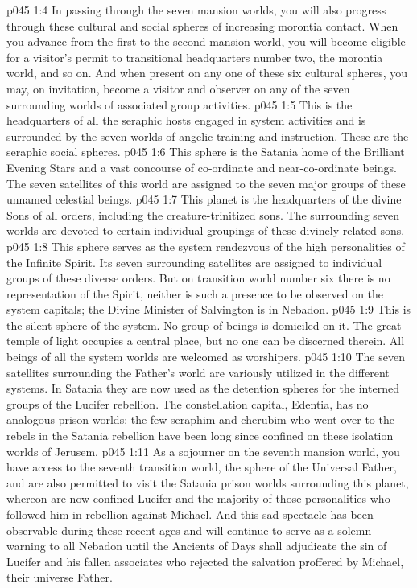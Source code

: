 \vs p045 1:4 In passing through the seven mansion worlds, you will also progress through these cultural and social spheres of increasing morontia contact. When you advance from the first to the second mansion world, you will become eligible for a visitor’s permit to transitional headquarters number two, the morontia world, and so on. And when present on any one of these six cultural spheres, you may, on invitation, become a visitor and observer on any of the seven surrounding worlds of associated group activities.
\vs p045 1:5 \pc {} This is the headquarters of all the seraphic hosts engaged in system activities and is surrounded by the seven worlds of angelic training and instruction. These are the seraphic social spheres.
\vs p045 1:6 \pc {} This sphere is the Satania home of the Brilliant Evening Stars and a vast concourse of co\hyp{}ordinate and near\hyp{}co\hyp{}ordinate beings. The seven satellites of this world are assigned to the seven major groups of these unnamed celestial beings.
\vs p045 1:7 \pc {} This planet is the headquarters of the divine Sons of all orders, including the creature\hyp{}trinitized sons. The surrounding seven worlds are devoted to certain individual groupings of these divinely related sons.
\vs p045 1:8 \pc {} This sphere serves as the system rendezvous of the high personalities of the Infinite Spirit. Its seven surrounding satellites are assigned to individual groups of these diverse orders. But on transition world number six there is no representation of the Spirit, neither is such a presence to be observed on the system capitals; the Divine Minister of Salvington is  in Nebadon.
\vs p045 1:9 \pc {} This is the silent sphere of the system. No group of beings is domiciled on it. The great temple of light occupies a central place, but no one can be discerned therein. All beings of all the system worlds are welcomed as worshipers.
\vs p045 1:10 The seven satellites surrounding the Father’s world are variously utilized in the different systems. In Satania they are now used as the detention spheres for the interned groups of the Lucifer rebellion. The constellation capital, Edentia, has no analogous prison worlds; the few seraphim and cherubim who went over to the rebels in the Satania rebellion have been long since confined on these isolation worlds of Jerusem.
\vs p045 1:11 As a sojourner on the seventh mansion world, you have access to the seventh transition world, the sphere of the Universal Father, and are also permitted to visit the Satania prison worlds surrounding this planet, whereon are now confined Lucifer and the majority of those personalities who followed him in rebellion against Michael. And this sad spectacle has been observable during these recent ages and will continue to serve as a solemn warning to all Nebadon until the Ancients of Days shall adjudicate the sin of Lucifer and his fallen associates who rejected the salvation proffered by Michael, their universe Father.
